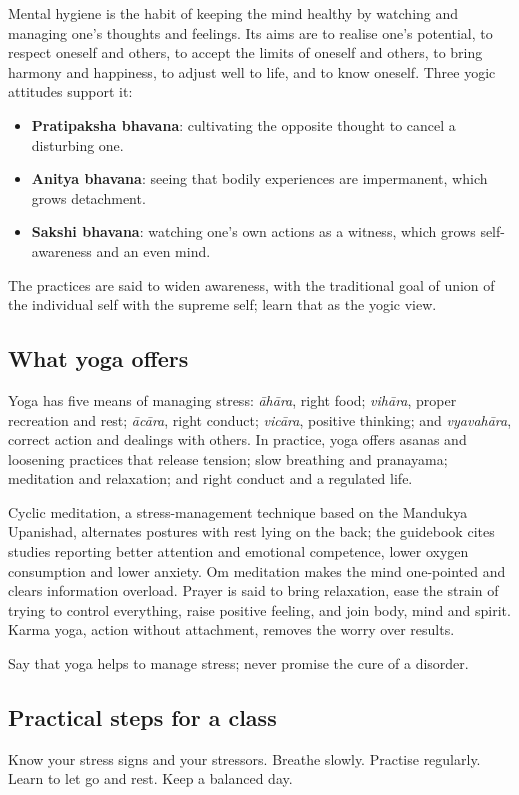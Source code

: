 Mental hygiene is the habit of keeping the mind healthy by watching and managing one's thoughts and feelings. Its aims are to realise one's potential, to respect oneself and others, to accept the limits of oneself and others, to bring harmony and happiness, to adjust well to life, and to know oneself. Three yogic attitudes support it:
\begin{itemize}
\item \textbf{Pratipaksha bhavana}: cultivating the opposite thought to cancel a disturbing one.
\item \textbf{Anitya bhavana}: seeing that bodily experiences are impermanent, which grows detachment.
\item \textbf{Sakshi bhavana}: watching one's own actions as a witness, which grows self-awareness and an even mind.
\end{itemize}
The practices are said to widen awareness, with the traditional goal of union of the individual self with the supreme self; learn that as the yogic view.

\subsection*{What yoga offers}
Yoga has five means of managing stress: \emph{āhāra}, right food; \emph{vihāra}, proper recreation and rest; \emph{ācāra}, right conduct; \emph{vicāra}, positive thinking; and \emph{vyavahāra}, correct action and dealings with others. In practice, yoga offers asanas and loosening practices that release tension; slow breathing and pranayama; meditation and relaxation; and right conduct and a regulated life.

Cyclic meditation, a stress-management technique based on the Mandukya Upanishad, alternates postures with rest lying on the back; the guidebook cites studies reporting better attention and emotional competence, lower oxygen consumption and lower anxiety. Om meditation makes the mind one-pointed and clears information overload. Prayer is said to bring relaxation, ease the strain of trying to control everything, raise positive feeling, and join body, mind and spirit. Karma yoga, action without attachment, removes the worry over results.

Say that yoga helps to manage stress; never promise the cure of a disorder.

\subsection*{Practical steps for a class}
Know your stress signs and your stressors. Breathe slowly. Practise regularly. Learn to let go and rest. Keep a balanced day.

